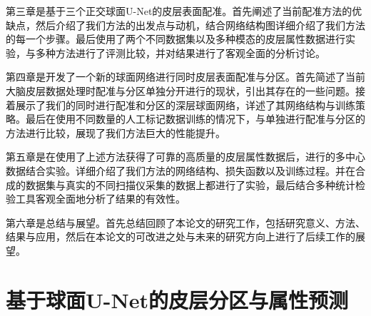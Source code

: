 第三章是基于三个正交球面U-Net的皮层表面配准。首先阐述了当前配准方法的优缺点，然后介绍了我们方法的出发点与动机，结合网络结构图详细介绍了我们方法的每一个步骤。最后使用了两个不同数据集以及多种模态的皮层属性数据进行实验，与多种方法进行了评测比较，并对结果进行了客观全面的分析讨论。

第四章是开发了一个新的球面网络进行同时皮层表面配准与分区。首先简述了当前大脑皮层数据处理时配准与分区单独分开进行的现状，引出其存在的一些问题。接着展示了我们的同时进行配准和分区的深层球面网络，详述了其网络结构与训练策略。最后在使用不同数量的人工标记数据训练的情况下，与单独进行配准与分区的方法进行比较，展现了我们方法巨大的性能提升。

第五章是在使用了上述方法获得了可靠的高质量的皮层属性数据后，进行的多中心数据结合实验。详细介绍了我们方法的网络结构、损失函数以及训练过程。并在合成的数据集与真实的不同扫描仪采集的数据上都进行了实验，最后结合多种统计检验工具客观全面地分析了结果的有效性。

第六章是总结与展望。首先总结回顾了本论文的研究工作，包括研究意义、方法、结果与应用，然后在本论文的可改进之处与未来的研究方向上进行了后续工作的展望。





\chapter{基于球面U-Net的皮层分区与属性预测}\label{sec:基于球面U-Net的皮层分区与属性预测}

